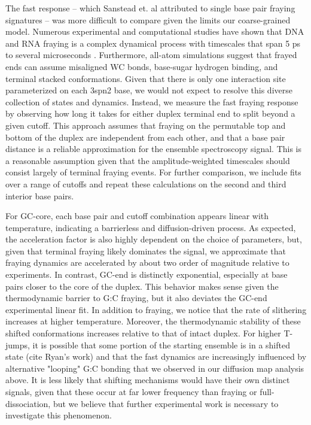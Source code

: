 \documentclass[journal=jpcbfk,manuscript=article]{achemso}
\begin{document}
The fast response -- which Sanstead et. al attributed to single base pair fraying signatures -- was more difficult to compare given the limits our coarse-grained model. Numerous experimental and computational studies have shown that DNA and RNA fraying is a complex dynamical process with timescales that span 5 ps to several microseconds \citep{ Nonin1995TerminalFraying, Nikolova2012ProbingSimulations, Andreatta2006UltrafastHelix, Galindo-Murillo2015ConvergenceDGCACGAACGAACGAACGC}. Furthermore, all-atom simulations suggest that frayed ends can assume misaligned WC bonds, base-sugar hydrogen binding, and terminal stacked conformations\citep{PinamontiTheModels, Zgarbova2014BaseRNA}. Given that there is only one interaction site parameterized on each 3spn2 base, we would not expect to resolve this diverse collection of states and dynamics. Instead, we measure the fast fraying response by observing how long it takes for either duplex terminal end to split beyond a given cutoff. This approach assumes that fraying on the permutable top and bottom of the duplex are independent from each other, and that a base pair distance is a reliable approximation for the ensemble spectroscopy signal. This is a reasonable assumption given that the amplitude-weighted timescales should consist largely of terminal fraying events. For further comparison, we include fits over a range of cutoffs and repeat these calculations on the second and third interior base pairs.

For GC-core, each base pair and cutoff combination appears linear with temperature, indicating a barrierless and diffusion-driven process. As expected, the acceleration factor is also highly dependent on the choice of parameters, but, given that terminal fraying likely dominates the signal, we approximate that fraying dynamics are accelerated by about two order of magnitude relative to experiments. In contrast, GC-end is distinctly exponential, especially at base pairs closer to the core of the duplex. This behavior makes sense given the thermodynamic barrier to G:C fraying, but it also deviates the GC-end experimental linear fit. In addition to fraying, we notice that the rate of slithering increases at higher temperature. Moreover, the thermodynamic stability of these shifted conformations increases relative to that of intact duplex. For higher T-jumps, it is possible that some portion of the starting ensemble is in a shifted state (cite Ryan's work) and that the fast dynamics are increasingly influenced by alternative "looping" G:C bonding that we observed in our diffusion map analysis above. It is less likely that shifting mechanisms would have their own distinct signals, given that these occur at far lower frequency than fraying or full-dissociation, but we believe that further experimental work is necessary to investigate this phenomenon.
\end{document}

